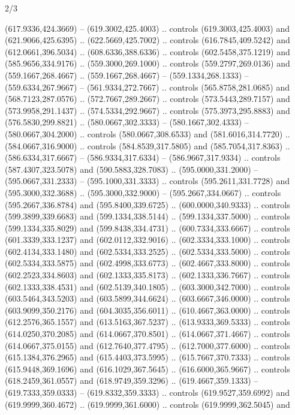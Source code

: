 \begin{flagdescription}{2/3}
\begin{scope}[xshift=0.5\flaglength,yshift=0.5\flagwidth,scale=\flagwidth/525.28]
\begin{scope}[y=0.1mm, x=0.1mm, yscale=-1,shift={(-381.5,-404)}]
\begin{scope}[shift={(5.25001,4.53053)},miter limit=4.00,line width=0.800\lw]
  (617.9336,424.3669) -- (619.3002,425.4003) .. controls (619.3003,425.4003) and
  (621.9066,425.6395) .. (622.5669,425.7002) .. controls (616.7845,409.5242) and
  (612.0661,396.5034) .. (608.6336,388.6336) .. controls (602.5458,375.1219) and
  (585.9656,334.9176) .. (559.3000,269.1000) .. controls (559.2797,269.0136) and
  (559.1667,268.4667) .. (559.1667,268.4667) -- (559.1334,268.1333) --
  (559.6334,267.9667) -- (561.9334,272.7667) .. controls (565.8758,281.0685) and
  (568.7123,287.0576) .. (572.7667,289.2667) .. controls (573.5443,289.7157) and
  (573.9958,291.1437) .. (574.5334,292.9667) .. controls (575.3973,295.8883) and
  (576.5830,299.8821) .. (580.0667,302.3333) -- (580.1667,302.4333) --
  (580.0667,304.2000) .. controls (580.0667,308.6533) and (581.6016,314.7720) ..
  (584.0667,316.9000) .. controls (584.8539,317.5805) and (585.7054,317.8363) ..
  (586.6334,317.6667) -- (586.9334,317.6334) -- (586.9667,317.9334) .. controls
  (587.4307,323.5078) and (590.5883,328.7083) .. (595.0000,331.2000) --
  (595.0667,331.2333) -- (595.1000,331.3333) .. controls (595.2611,331.7728) and
  (595.3000,332.3688) .. (595.3000,332.9000) -- (595.2667,334.0667) .. controls
  (595.2667,336.8784) and (595.8400,339.6725) .. (600.0000,340.9333) .. controls
  (599.3899,339.6683) and (599.1334,338.5144) .. (599.1334,337.5000) .. controls
  (599.1334,335.8029) and (599.8438,334.4731) .. (600.7334,333.6667) .. controls
  (601.3339,333.1237) and (602.0112,332.9016) .. (602.3334,333.1000) .. controls
  (602.4134,333.1480) and (602.5334,333.2525) .. (602.5334,333.5000) .. controls
  (602.5334,333.5875) and (602.4998,333.6773) .. (602.4667,333.8000) .. controls
  (602.2523,334.8603) and (602.1333,335.8173) .. (602.1333,336.7667) .. controls
  (602.1333,338.4531) and (602.5139,340.1805) .. (603.3000,342.7000) .. controls
  (603.5464,343.5203) and (603.5899,344.6624) .. (603.6667,346.0000) .. controls
  (603.9099,350.2176) and (604.3035,356.6011) .. (610.4667,363.0000) .. controls
  (612.2576,365.1557) and (613.5163,367.5237) .. (613.9333,369.5333) .. controls
  (614.0250,370.2085) and (614.0667,370.8501) .. (614.0667,371.4667) .. controls
  (614.0667,375.0155) and (612.7640,377.4795) .. (612.7000,377.6000) .. controls
  (615.1384,376.2965) and (615.4403,373.5995) .. (615.7667,370.7333) .. controls
  (615.9448,369.1696) and (616.1029,367.5645) .. (616.6000,365.9667) .. controls
  (618.2459,361.0557) and (618.9749,359.3296) .. (619.4667,359.1333) --
  (619.7333,359.0333) -- (619.8332,359.3333) .. controls (619.9527,359.6992) and
  (619.9999,360.4672) .. (619.9999,361.6000) .. controls (619.9999,362.5045) and

\end{scope}
\end{scope}
\end{scope}
\end{flagdescription}
